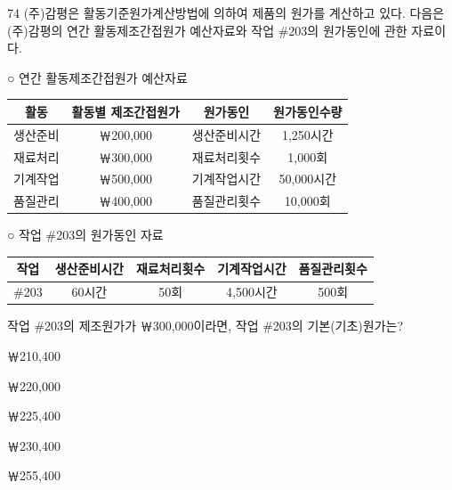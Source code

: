 \begin{question}{74}
(주)감평은 활동기준원가계산방법에 의하여 제품의 원가를 계산하고 있다. 다음은 (주)감평의 연간 활동제조간접원가 예산자료와 작업 \#203의 원가동인에 관한 자료이다.
\begin{framedtext}
○ 연간 활동제조간접원가 예산자료 \par
{\small\centering
\begin{tabular}{|c|c|c|c|}
\hline
활동 & 활동별 제조간접원가 & 원가동인 & 원가동인수량 \\
\hline
생산준비 & ￦200,000 & 생산준비시간 & 1,250시간 \\
\hline
재료처리 & ￦300,000 & 재료처리횟수 & 1,000회 \\
\hline
기계작업 & ￦500,000 & 기계작업시간 & 50,000시간 \\
\hline
품질관리 & ￦400,000 & 품질관리횟수 & 10,000회 \\
\hline
\end{tabular}\par}
\vspace{0.5em}
○ 작업 \#203의 원가동인 자료 \par
{\small\centering
\begin{tabular}{|c|c|c|c|c|}
\hline
작업 & 생산준비시간 & 재료처리횟수 & 기계작업시간 & 품질관리횟수 \\
\hline
\#203 & 60시간 & 50회 & 4,500시간 & 500회 \\
\hline
\end{tabular}\par}
\end{framedtext}
작업 \#203의 제조원가가 ￦300,000이라면, 작업 \#203의 기본(기초)원가는? \par
\begin{choices}
  \item ￦210,400
  \item ￦220,000
  \item ￦225,400
  \item ￦230,400
  \item ￦255,400
\end{choices}
\end{question}
